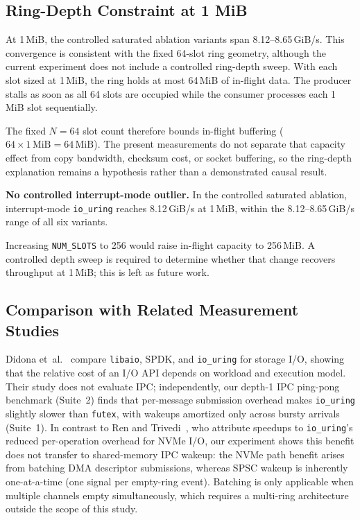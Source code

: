 \documentclass[10pt,conference]{IEEEtran}
\begin{document}
\subsection{Ring-Depth Constraint at 1 MiB}

At 1\,MiB, the controlled saturated ablation variants span
8.12--8.65\,GiB/s.  This convergence is consistent with the fixed 64-slot
ring geometry, although the current experiment does not include a controlled
ring-depth sweep.
With each slot sized at
1\,MiB, the ring holds at most 64\,MiB of in-flight data.  The producer stalls
as soon as all 64 slots are occupied while the consumer processes each 1\,MiB
slot sequentially.

The fixed $N = 64$ slot count therefore bounds in-flight buffering
($64 \times 1\,\text{MiB} = 64\,\text{MiB}$).  The present measurements do not
separate that capacity effect from copy bandwidth, checksum cost, or socket
buffering, so the ring-depth explanation remains a hypothesis rather than a
demonstrated causal result.

\textbf{No controlled interrupt-mode outlier.}  In the controlled saturated
ablation, interrupt-mode \texttt{io\_uring} reaches 8.12\,GiB/s at 1\,MiB,
within the 8.12--8.65\,GiB/s range of all six variants.

Increasing \texttt{NUM\_SLOTS} to 256 would raise in-flight capacity to
256\,MiB.  A controlled depth sweep is required to determine whether that
change recovers throughput at 1\,MiB; this is left as future work.

\subsection{Comparison with Related Measurement Studies}

Didona et~al.~\cite{didona2022} compare \texttt{libaio}, SPDK, and
\texttt{io\_uring} for storage I/O, showing that the relative cost of an I/O
API depends on workload and execution model. Their study does not evaluate
IPC; independently, our depth-1 IPC ping-pong benchmark (Suite~2) finds that
per-message submission overhead makes \texttt{io\_uring} slightly slower than
\texttt{futex}, with wakeups amortized only across bursty arrivals (Suite~1).
In contrast to Ren and Trivedi~\cite{ren2023}, who attribute speedups to
\texttt{io\_uring}'s reduced per-operation overhead for NVMe I/O, our
experiment shows this benefit does not transfer to shared-memory IPC wakeup:
the NVMe path benefit arises from batching DMA descriptor submissions, whereas
SPSC wakeup is inherently one-at-a-time (one signal per empty-ring event).
Batching is only applicable when multiple channels empty simultaneously, which
requires a multi-ring architecture outside the scope of this study.
\end{document}
